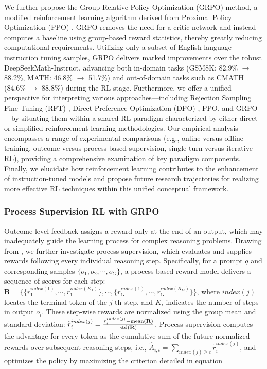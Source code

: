 \begin{itemize}[topsep=0pt]
We further propose the Group Relative Policy Optimization (GRPO) method, a modified reinforcement learning algorithm derived from Proximal Policy Optimization (PPO) \citep{schulman2017proximal}. GRPO removes the need for a critic network and instead computes a baseline using group-based reward statistics, thereby greatly reducing computational requirements. Utilizing only a subset of English-language instruction tuning samples, GRPO delivers marked improvements over the robust DeepSeekMath-Instruct, advancing both in-domain tasks (GSM8K: 82.9\% $\rightarrow$ 88.2\%, MATH: 46.8\% $\rightarrow$ 51.7\%) and out-of-domain tasks such as CMATH (84.6\% $\rightarrow$ 88.8\%) during the RL stage. Furthermore, we offer a unified perspective for interpreting various approaches—including Rejection Sampling Fine-Tuning (RFT) \citep{yuan2023scaling}, Direct Preference Optimization (DPO) \citep{dpo}, PPO, and GRPO—by situating them within a shared RL paradigm characterized by either direct or simplified reinforcement learning methodologies. Our empirical analysis encompasses a range of experimental comparisons (e.g., online versus offline training, outcome versus process-based supervision, single-turn versus iterative RL), providing a comprehensive examination of key paradigm components. Finally, we elucidate how reinforcement learning contributes to the enhancement of instruction-tuned models and propose future research trajectories for realizing more effective RL techniques within this unified conceptual framework.

\subsubsection{Process Supervision RL with GRPO} Outcome-level feedback assigns a reward only at the end of an output, which may inadequately guide the learning process for complex reasoning problems. Drawing from \cite{wang2023math}, we further investigate process supervision, which evaluates and supplies rewards following every individual reasoning step. Specifically, for a prompt $q$ and corresponding samples $\{o_1, o_2, \cdots, o_G\}$, a process-based reward model delivers a sequence of scores for each step: $\mathbf{R} = \{ \{r_1^{index(1)},\cdots,r_1^{index(K_1)}\}, \cdots,  \{r_G^{index(1)},\cdots,r_G^{index(K_G)}\} \}$, where $index(j)$ locates the terminal token of the $j$-th step, and $K_i$ indicates the number of steps in output $o_i$. These step-wise rewards are normalized using the group mean and standard deviation: $\widetilde{r}_i^{index(j)} = \frac{r_i^{index(j)} - {\rm mean(\mathbf{R})}}{{\rm std(\mathbf{R})}}$.
Process supervision computes the advantage for every token as the cumulative sum of the future normalized rewards over subsequent reasoning steps, i.e., $\hat{A}_{i, t} = \sum_{index(j) \ge t} \widetilde{r}_i^{index(j)}$,
and optimizes the policy by maximizing the criterion detailed in equation


\end{itemize}

